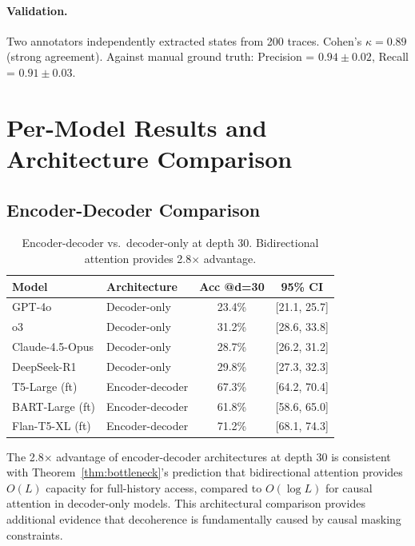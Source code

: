 \documentclass{article}
\theoremstyle{plain}
\theoremstyle{definition}
\theoremstyle{remark}
\begin{document}
\paragraph{Validation.} Two annotators independently extracted states from 200 traces. Cohen's $\kappa = 0.89$ (strong agreement). Against manual ground truth: Precision = $0.94\pm0.02$, Recall = $0.91\pm0.03$.


\section{Per-Model Results and Architecture Comparison}
\label{app:results}

\subsection{Encoder-Decoder Comparison}
\label{app:enc_dec}

\begin{table}[h]
\centering
\caption{Encoder-decoder vs.\ decoder-only at depth 30. Bidirectional attention provides 2.8$\times$ advantage.}
\label{tab:enc_dec_full}
\small
\begin{tabular}{@{}llcc@{}}
\toprule
\textbf{Model} & \textbf{Architecture} & \textbf{Acc @d=30} & \textbf{95\% CI} \\
\midrule
GPT-4o & Decoder-only & 23.4\% & [21.1, 25.7] \\
o3 & Decoder-only & 31.2\% & [28.6, 33.8] \\
Claude-4.5-Opus & Decoder-only & 28.7\% & [26.2, 31.2] \\
DeepSeek-R1 & Decoder-only & 29.8\% & [27.3, 32.3] \\
T5-Large (ft) & Encoder-decoder & 67.3\% & [64.2, 70.4] \\
BART-Large (ft) & Encoder-decoder & 61.8\% & [58.6, 65.0] \\
Flan-T5-XL (ft) & Encoder-decoder & 71.2\% & [68.1, 74.3] \\
\bottomrule
\end{tabular}
\end{table}

The 2.8$\times$ advantage of encoder-decoder architectures at depth 30 is consistent with Theorem~\ref{thm:bottleneck}'s prediction that bidirectional attention provides $O(L)$ capacity for full-history access, compared to $O(\log L)$ for causal attention in decoder-only models. This architectural comparison provides additional evidence that decoherence is fundamentally caused by causal masking constraints.
\end{document}
